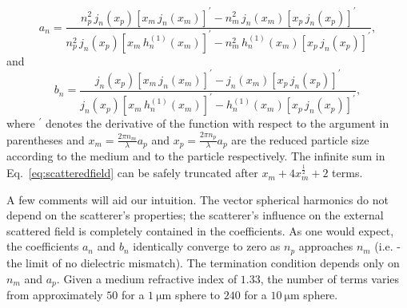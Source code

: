 \begin{equation}
  \label{eq:an}
  a_n = \frac{n_p^2 \, j_n(x_p) \left[x_m \, j_n(x_m)\right]^\prime -
    n_m^2 \, j_n(x_m) \left[x_p \, j_n(x_p)\right]^\prime}{
    n_p^2 \, j_n(x_p) \left[x_m \, h^{(1)}_n(x_m)\right]^\prime -
    n_m^2 \, h^{(1)}_n(x_m) \left[x_p \, j_n(x_p)\right]^\prime},
\end{equation}
and
\begin{equation}
\label{eq:bn}
  b_n = \frac{j_n(x_p) \left[x_m \, j_n(x_m)\right]^\prime -
    j_n(x_m) \left[x_p \, j_n(x_p)\right]^\prime}{
    j_n(x_p) \left[x_m \, h^{(1)}_n(x_m)\right]^\prime -
    h^{(1)}_n(x_m) \left[x_p \, j_n(x_p)\right]^\prime},
\end{equation}
where $^\prime$ denotes the derivative of the function with respect
to the argument in parentheses and $x_m = \frac{2\pi n_m}{\lambda} a_p$
and $x_p = \frac{2\pi n_p}{\lambda} a_p$ are the reduced particle size according
to the medium and to the particle respectively. The infinite
sum in Eq.~\ref{eq:scatteredfield} can be safely truncated after
$x_m + 4x_m^{\frac{1}{2}} + 2$ terms.

A few comments will aid our intuition. The vector spherical harmonics
do not depend on the scatterer's properties; the scatterer's influence
on the external scattered field is completely contained in the coefficients.
As one would expect, the coefficients $a_n$ and $b_n$ identically converge to
zero as $n_p$ approaches $n_m$ (i.e. - the limit of no dielectric mismatch).
The termination condition depends only on $n_m$ and $a_p$. Given a medium
refractive index of $1.33$, the number of terms varies from approximately
$50$ for a $\SI{1}{\um}$ sphere to $\num{240}$ for a $\SI{10}{\um}$ sphere.


